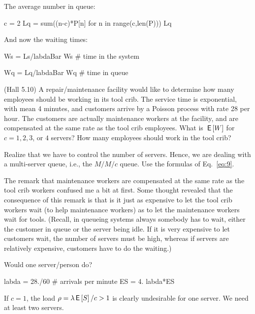 \begin{exercise}
\begin{solution}
The average number in queue: 
\begin{pyconsole}
c = 2
Lq = sum((n-c)*P[n] for n in range(c,len(P)))
Lq
\end{pyconsole} 

And now the waiting times:

\begin{pyconsole}
Ws = Ls/labdaBar
Ws # time in the system

Wq = Lq/labdaBar
Wq # time in queue
\end{pyconsole} 

    \end{solution}
\end{exercise}

\begin{exercise}
  (Hall 5.10) A repair/maintenance facility would like to determine
  how many employees should be working in its tool crib. The service
  time is exponential, with mean 4 minutes, and customers arrive by a
  Poisson process with rate 28 per hour. The customers are actually
  maintenance workers at the facility, and are compensated at the same
  rate as the tool crib employees.
 What is $\,\mathsf{E}\left[W\right]$ for $c=1, 2, 3$, or $4$ servers? How many employees should work in the tool crib?
  \begin{hint}
Realize that we have to control the number of servers. Hence,
    we are dealing with a multi-server queue, i.e., the $M/M/c$
    queue. Use the formulas of Eq.~\eqref{eq:9}.

The remark that maintenance workers are compensated at the same rate
as the tool crib workers confused me a bit at first.  Some thought
revealed that the consequence of this remark is that is it just as
expensive to let the tool crib workers wait (to help maintenance
workers) as to let the maintenance workers wait for tools. (Recall, in
queueing systems always somebody has to wait, either the customer in queue or
the server being idle. If it is very expensive to let customers wait, the number
of servers must be high, whereas if servers are relatively expensive, customers have to do the waiting.)
  \end{hint}
  \begin{solution}

      Would one server/person do? 
\begin{pyconsole}
labda = 28./60 # arrivals per minute
ES = 4.
labda*ES
\end{pyconsole} 

If $c=1$, the load $\rho=\lambda \,\mathsf{E}\left[S\right]/c >1$ is clearly undesirable for one server.  We need at
least two servers.


\end{solution}
\end{exercise}
